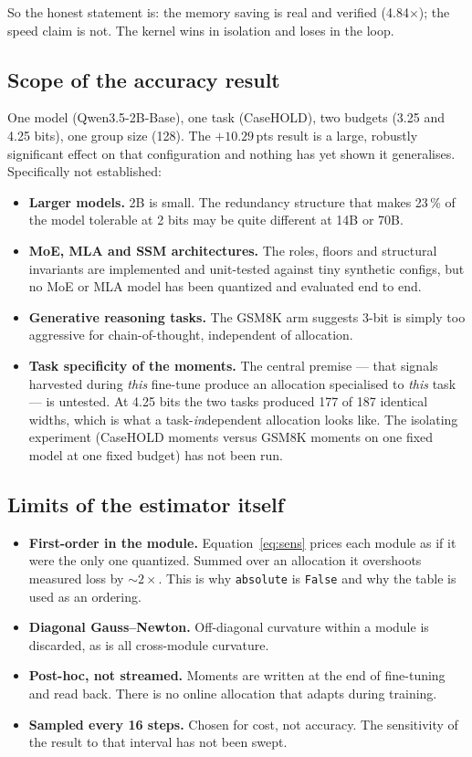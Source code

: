 \documentclass[11pt]{article}
\newcommand{\x}{$\times$}
\newcommand{\pt}{\,pts}
\newcommand{\pct}{\,\%}
\newcommand{\code}[1]{\texttt{#1}}
\begin{document}
So the honest statement is: the memory saving is real and verified (4.84\x); the speed claim is
not. The kernel wins in isolation and loses in the loop.

\subsection{Scope of the accuracy result}

One model (Qwen3.5-2B-Base), one task (CaseHOLD), two budgets (3.25 and 4.25 bits), one
group size (128). The $+10.29$\pt{} result is a large, robustly significant effect on that
configuration and nothing has yet shown it generalises. Specifically not established:

\begin{itemize}
\item \textbf{Larger models.} 2B is small. The redundancy structure that makes 23\pct{} of the
model tolerable at 2 bits may be quite different at 14B or 70B.
\item \textbf{MoE, MLA and SSM architectures.} The roles, floors and structural invariants are
implemented and unit-tested against tiny synthetic configs, but no MoE or MLA model has been
quantized and evaluated end to end.
\item \textbf{Generative reasoning tasks.} The GSM8K arm suggests 3-bit is simply too aggressive
for chain-of-thought, independent of allocation.
\item \textbf{Task specificity of the moments.} The central premise --- that signals harvested
during \emph{this} fine-tune produce an allocation specialised to \emph{this} task --- is
untested. At 4.25 bits the two tasks produced 177 of 187 identical widths, which is what a
task-\emph{in}dependent allocation looks like. The isolating experiment (CaseHOLD moments versus
GSM8K moments on one fixed model at one fixed budget) has not been run.
\end{itemize}

\subsection{Limits of the estimator itself}

\begin{itemize}
\item \textbf{First-order in the module.} Equation~\ref{eq:sens} prices each module as if it were
the only one quantized. Summed over an allocation it overshoots measured loss by ${\sim}2\times$.
This is why \code{absolute} is \code{False} and why the table is used as an ordering.
\item \textbf{Diagonal Gauss--Newton.} Off-diagonal curvature within a module is discarded, as is
all cross-module curvature.
\item \textbf{Post-hoc, not streamed.} Moments are written at the end of fine-tuning and read
back. There is no online allocation that adapts during training.
\item \textbf{Sampled every 16 steps.} Chosen for cost, not accuracy. The sensitivity of the
result to that interval has not been swept.
\end{itemize}
\end{document}
